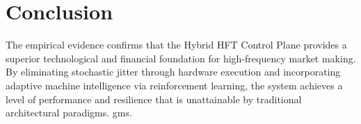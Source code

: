 \section{Conclusion}
The empirical evidence confirms that the Hybrid HFT Control Plane provides a superior technological and financial foundation for high-frequency market making. By eliminating stochastic jitter through hardware execution and incorporating adaptive machine intelligence via reinforcement learning, the system achieves a level of performance and resilience that is unattainable by traditional architectural paradigms.
gms.

